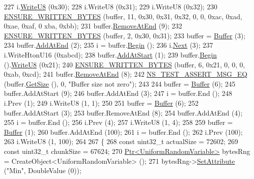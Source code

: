 \begin{DoxyCode}
227   i.\hyperlink{classns3_1_1Buffer_1_1Iterator_a3c7bacca6cbb821c9d14fa4626b7ae16}{WriteU8} (0x30);
228   i.WriteU8 (0x31);
229   i.WriteU8 (0x32);
230   \hyperlink{buffer-test_8cc_adb8db1b0f6eec9da1f9f6d8b9f1e4ba8}{ENSURE\_WRITTEN\_BYTES} (buffer, 11, 0x30, 0x31, 0x32, 0, 0, 0xac, 0xad, 0xae, 0xaf, 0
      xba, 0xbb);
231   buffer.\hyperlink{classns3_1_1Buffer_a83b30fd8e1202e778fb471757b800d47}{RemoveAtEnd} (9);
232   \hyperlink{buffer-test_8cc_adb8db1b0f6eec9da1f9f6d8b9f1e4ba8}{ENSURE\_WRITTEN\_BYTES} (buffer, 2, 0x30, 0x31);
233   buffer = \hyperlink{classns3_1_1Buffer}{Buffer} (3);
234   buffer.\hyperlink{classns3_1_1Buffer_a92dd87809af24fb10696fee9a9cb56cf}{AddAtEnd} (2);
235   i = buffer.\hyperlink{classns3_1_1Buffer_a893d4bf50df13e730b6cd0fda91b967f}{Begin} ();
236   i.\hyperlink{classns3_1_1Buffer_1_1Iterator_a5eaa564bdc98d063b7e94b1768aeed6b}{Next} (3);
237   i.WriteHtonU16 (0xabcd);
238   buffer.\hyperlink{classns3_1_1Buffer_a8abd8164c3671d3dadc98fc66fade7b1}{AddAtStart} (1);
239   buffer.\hyperlink{classns3_1_1Buffer_a893d4bf50df13e730b6cd0fda91b967f}{Begin} ().\hyperlink{classns3_1_1Buffer_1_1Iterator_a3c7bacca6cbb821c9d14fa4626b7ae16}{WriteU8} (0x21);
240   \hyperlink{buffer-test_8cc_adb8db1b0f6eec9da1f9f6d8b9f1e4ba8}{ENSURE\_WRITTEN\_BYTES} (buffer, 6, 0x21, 0, 0, 0, 0xab, 0xcd);
241   buffer.\hyperlink{classns3_1_1Buffer_a83b30fd8e1202e778fb471757b800d47}{RemoveAtEnd} (8);
242   \hyperlink{group__testing_ga2a9d78cffb3db8e867c35fff0b698cf5}{NS\_TEST\_ASSERT\_MSG\_EQ} (buffer.\hyperlink{classns3_1_1Buffer_a3047b8f2dad303c6370695122f1884f0}{GetSize} (), 0, \textcolor{stringliteral}{"Buffer size not zero"});
243 
244   buffer = \hyperlink{classns3_1_1Buffer}{Buffer} (6);
245   buffer.AddAtStart (9);
246   buffer.AddAtEnd (3);
247   i = buffer.End ();
248   i.Prev (1);
249   i.WriteU8 (1, 1);
250 
251   buffer = \hyperlink{classns3_1_1Buffer}{Buffer} (6);
252   buffer.AddAtStart (3);
253   buffer.RemoveAtEnd (8);
254   buffer.AddAtEnd (4);
255   i = buffer.End ();
256   i.Prev (4);
257   i.WriteU8 (1, 4);
258 
259   buffer = \hyperlink{classns3_1_1Buffer}{Buffer} (1);
260   buffer.AddAtEnd (100);
261   i = buffer.End ();
262   i.Prev (100);
263   i.WriteU8 (1, 100);
264 
267   \{
268     \textcolor{keyword}{const} uint32\_t actualSize = 72602;
269     \textcolor{keyword}{const} uint32\_t chunkSize = 67624;
270     \hyperlink{classns3_1_1Ptr}{Ptr<UniformRandomVariable>} bytesRng = CreateObject<UniformRandomVariable> ();
271     bytesRng->\hyperlink{classns3_1_1ObjectBase_ac60245d3ea4123bbc9b1d391f1f6592f}{SetAttribute} (\textcolor{stringliteral}{"Min"}, DoubleValue (0));

\end{DoxyCode}
